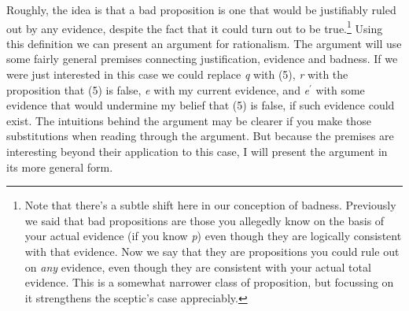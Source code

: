 Roughly, the idea is that a bad proposition is one that would be
justifiably ruled out by any evidence, despite the fact that it could
turn out to be true.\footnote{Note that there's a subtle shift here in
  our conception of badness. Previously we said that bad propositions
  are those you allegedly know on the basis of your actual evidence (if
  you know \emph{p}) even though they are logically consistent with that
  evidence. Now we say that they are propositions you could rule out on
  \emph{any} evidence, even though they are consistent with your actual
  total evidence. This is a somewhat narrower class of proposition, but
  focussing on it strengthens the sceptic's case appreciably.} Using
this definition we can present an argument for rationalism. The argument
will use some fairly general premises connecting justification, evidence
and badness. If we were just interested in this case we could replace
\emph{q} with (5), \emph{r} with the proposition that (5) is false,
\emph{e} with my current evidence, and \emph{e}\(^\prime\) with some
evidence that would undermine my belief that (5) is false, if such
evidence could exist. The intuitions behind the argument may be clearer
if you make those substitutions when reading through the argument. But
because the premises are interesting beyond their application to this
case, I will present the argument in its more general form.

